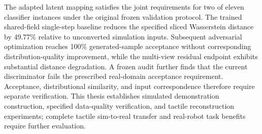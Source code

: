 \begin{eabstract}
The adapted latent mapping satisfies the joint requirements for two of eleven classifier instances under the original frozen validation protocol. The trained shared-field single-step baseline reduces the specified sliced Wasserstein distance by 49.77\% relative to unconverted simulation inputs. Subsequent adversarial optimization reaches 100\% generated-sample acceptance without corresponding distribution-quality improvement, while the multi-view residual endpoint exhibits substantial distance degradation. A frozen audit further finds that the current discriminator fails the prescribed real-domain acceptance requirement. Acceptance, distributional similarity, and input correspondence therefore require separate verification. This thesis establishes simulated demonstration construction, specified data-quality verification, and tactile reconstruction experiments; complete tactile sim-to-real transfer and real-robot task benefits require further evaluation.
\end{eabstract}
